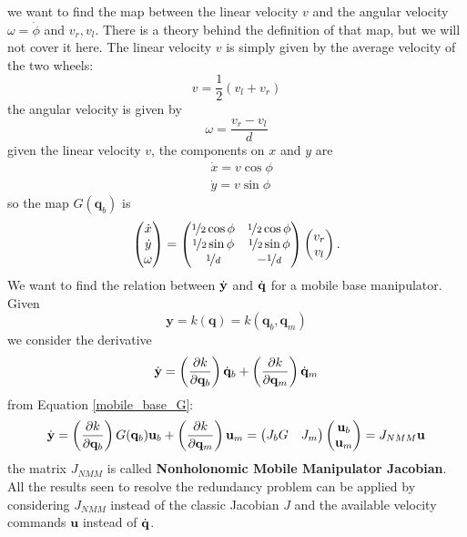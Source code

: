 \documentclass[10pt, a4paper]{report}
\newcommand{\y}{{\mathbf y}}
\newcommand{\q}{{\mathbf q}}
\begin{document}
we want to find the map between the linear velocity $v$ and the angular velocity $\omega=\dot \phi$ and $v_r,v_l$. There is a theory behind the definition of that map, but we will not cover it here. The linear velocity $v$ is simply given by the average velocity of the two wheels:\begin{equation}
    v=\frac{1}{2}(v_l+v_r)
\end{equation}
the angular velocity is given by\begin{equation}
    \omega = \frac{v_r-v_l}{d}
\end{equation}
given the linear velocity $v$, the components on $x$ and $y$ are\begin{align}
    &\dot x = v\cos\phi \\ 
    &\dot y=v\sin \phi
\end{align}
so the map $G(\q_b)$ is \begin{equation}
    \begin{pmatrix}
        \dot x\\\dot y\\ \omega
    \end{pmatrix}=\begin{pmatrix}
        \nicefrac{1}{2}\cos\phi&\nicefrac{1}{2}\cos\phi\\ 
        \nicefrac{1}{2}\sin\phi&\nicefrac{1}{2}\sin\phi\\ 
        \nicefrac{1}{d}&-\nicefrac{1}{d}
    \end{pmatrix}\begin{pmatrix}
        v_r\\v_l
    \end{pmatrix}.
\end{equation}
We want to find the relation between ${\dot{\mathbf y}}$ and ${\dot{\mathbf q}}$ for a mobile base manipulator. Given \begin{equation}
    \y=k(\q)=k(\q_b,\q_m)
\end{equation}
we consider the derivative\begin{equation}
    \dy=\left( \frac{\partial k}{\partial\q_b }\right)\dq_b+
    \left( \frac{\partial k}{\partial\q_m }\right)\dq_m
\end{equation}
from Equation \eqref{mobile_base_G}:
\begin{equation}
    \dy=\left( \frac{\partial k}{\partial\q_b }\right)G(\q_b)\mathbf u_b+
    \left( \frac{\partial k}{\partial\q_m }\right)\mathbf u_m=\begin{pmatrix}
        J_bG&J_m
    \end{pmatrix}\begin{pmatrix}
        \mathbf u_b\\ \mathbf u_m
    \end{pmatrix}=J_{NMM}\mathbf u
\end{equation}
the matrix $J_{NMM}$ is called \textbf{Nonholonomic Mobile Manipulator Jacobian}. All the results seen to resolve the redundancy problem can be applied by considering $J_{NMM}$ instead of the classic Jacobian $J$ and the available velocity commands $\mathbf u$ instead of ${\dot{\mathbf q}}$.
\end{document}
